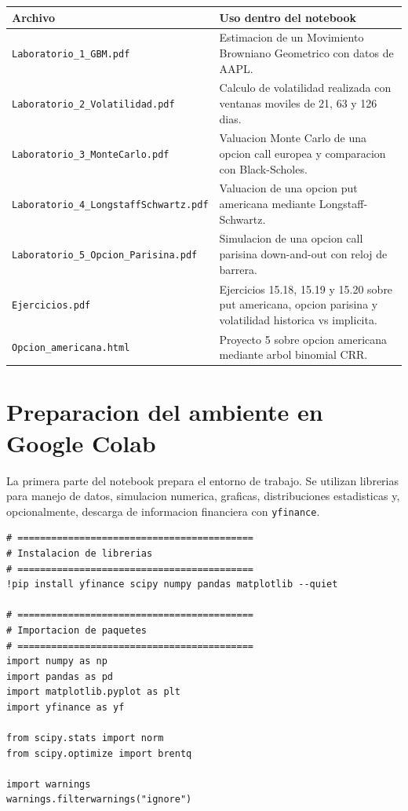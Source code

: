 \documentclass[12pt,a4paper]{article}
\begin{document}
\begin{longtable}{p{5cm}p{9cm}}
\toprule
\textbf{Archivo} & \textbf{Uso dentro del notebook} \\
\midrule
\endhead
\texttt{Laboratorio\_1\_GBM.pdf} & Estimacion de un Movimiento Browniano Geometrico con datos de AAPL. \\
\texttt{Laboratorio\_2\_Volatilidad.pdf} & Calculo de volatilidad realizada con ventanas moviles de 21, 63 y 126 dias. \\
\texttt{Laboratorio\_3\_MonteCarlo.pdf} & Valuacion Monte Carlo de una opcion call europea y comparacion con Black-Scholes. \\
\texttt{Laboratorio\_4\_LongstaffSchwartz.pdf} & Valuacion de una opcion put americana mediante Longstaff-Schwartz. \\
\texttt{Laboratorio\_5\_Opcion\_Parisina.pdf} & Simulacion de una opcion call parisina down-and-out con reloj de barrera. \\
\texttt{Ejercicios.pdf} & Ejercicios 15.18, 15.19 y 15.20 sobre put americana, opcion parisina y volatilidad historica vs implicita. \\
\texttt{Opcion\_americana.html} & Proyecto 5 sobre opcion americana mediante arbol binomial CRR. \\
\bottomrule
\end{longtable}

\section{Preparacion del ambiente en Google Colab}

\begin{markdowncell}
La primera parte del notebook prepara el entorno de trabajo. Se utilizan librerias para manejo de datos, simulacion numerica, graficas, distribuciones estadisticas y, opcionalmente, descarga de informacion financiera con \texttt{yfinance}.
\end{markdowncell}

\begin{lstlisting}[style=pythonstyle]
# ==========================================
# Instalacion de librerias
# ==========================================
!pip install yfinance scipy numpy pandas matplotlib --quiet

# ==========================================
# Importacion de paquetes
# ==========================================
import numpy as np
import pandas as pd
import matplotlib.pyplot as plt
import yfinance as yf

from scipy.stats import norm
from scipy.optimize import brentq

import warnings
warnings.filterwarnings("ignore")
\end{lstlisting}
\end{document}
